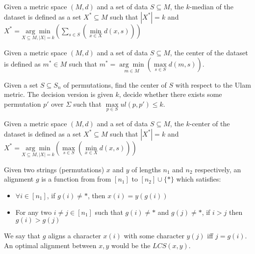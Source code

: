 \begin{definition}
\label{KMedian}
    Given a metric space $(M, d)$ and a set of data $S \subseteq M$, the $k$-median of the dataset is defined as a set $X^* \subseteq M$ such that $|X^*| = k$ and $X^* = \underset{X \subseteq M, |X| = k}{\arg \min} \left(\sum\limits_{s \in S} \left(\min\limits_{x \in X} d(x, s)\right) \right)$
\end{definition}

\begin{definition}
\label{Center String}
    Given a metric space $(M, d)$ and a set of data $S \subseteq M$, the center of the dataset is defined as $m^* \in M$ such that $m^* = \underset{m \in M}{\arg \min} \left(\max\limits_{s \in S} d(m, s)\right)$.
\end{definition}

\begin{definition}
\label{Ulam Center}
    Given a set $S \subseteq S_n$  of permutations, find the center of $S$ with respect to the Ulam metric. The decision version is given $k$, decide whether there exists some permutation $p'$ over $\Sigma$ such that $\max\limits_{p \in S} ul(p, p') \leq k$.
\end{definition}

\begin{definition}
\label{KCenter}
    Given a metric space $(M, d)$ and a set of data $S \subseteq M$, the $k$-center of the dataset is defined as a set $X^* \subseteq M$ such that $|X^*| = k$ and $X^* = \underset{X \subseteq M, |X| = k}{\arg \min} \left(\max\limits_{s \in S} \left(\min\limits_{x \in X} d(x, s)\right) \right)$
\end{definition}

\begin{definition}[Alignment]
\label{Alignment}
   Given two strings (permutations) $x$ and $y$ of lengths $n_1$ and $n_2$ respectively, an alignment $g$ is a function from
   from $[n_1]$ to $[n_2] \cup \{*\}$ which satisfies:
   \begin{itemize}
      \item $\forall i \in [n_1]$, if $g(i) \neq *$, then $x(i) = y(g(i))$
      \item For any two $i \neq j \in [n_1]$ such that $g(i) \neq *$ and $g(j) \neq *$, if $i > j$ then $g(i) > g(j)$ 
   \end{itemize}

   We say that $g$ aligns a character $x(i)$ with some character $y(j)$ iff $j = g(i)$.
   An optimal alignment between $x, y$ would be the $LCS(x, y)$.
\end{definition}

